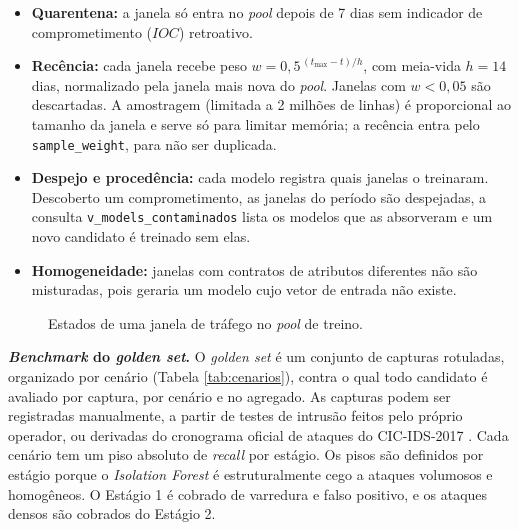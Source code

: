 \documentclass[a4paper,10pt, twocolumn]{article}
\begin{document}
\begin{itemize}
  \item \textbf{Quarentena:} a janela só entra no \textit{pool} depois de 7 dias sem
  indicador de comprometimento ($IOC$) retroativo.
  \item \textbf{Recência:} cada janela recebe peso
  $w = 0{,}5^{\,(t_{\max}-t)/h}$, com meia-vida $h = 14$ dias, normalizado pela
  janela mais nova do \textit{pool}. Janelas com $w < 0{,}05$ são descartadas. A
  amostragem (limitada a 2 milhões de linhas) é proporcional ao tamanho da janela e
  serve só para limitar memória; a recência entra pelo \texttt{sample\_weight},
  para não ser duplicada.
  \item \textbf{Despejo e procedência:} cada modelo registra quais janelas o
  treinaram. Descoberto um comprometimento, as janelas do período são despejadas,
  a consulta \texttt{v\_models\_contaminados} lista os modelos que as absorveram e um
  novo candidato é treinado sem elas.
  \item \textbf{Homogeneidade:} janelas com contratos de atributos diferentes não
  são misturadas, pois geraria um modelo cujo vetor de entrada não existe.
\end{itemize}
\begin{figure}[H]
  \centering
  
  \caption{Estados de uma janela de tráfego no \textit{pool} de treino.}
  \label{fig:ciclo}
\end{figure}

\textbf{\textit{Benchmark} do \textit{golden set}.} O \textit{golden set} é um conjunto de
capturas rotuladas, organizado por cenário (Tabela \ref{tab:cenarios}), contra o
qual todo candidato é avaliado por captura, por cenário e no agregado. As capturas
podem ser registradas manualmente, a partir de testes de intrusão feitos pelo
próprio operador, ou derivadas do cronograma oficial de ataques do CIC-IDS-2017
. Cada cenário tem um piso absoluto de \textit{recall} por estágio. Os pisos são definidos por estágio porque o
\textit{Isolation Forest} é estruturalmente cego a ataques volumosos e homogêneos. 
O Estágio 1 é cobrado de varredura e falso positivo, e
os ataques densos são cobrados do Estágio 2.
\end{document}
